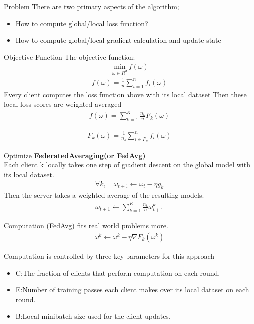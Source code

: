 \documentclass{beamer}
\begin{document}
\begin{frame}{Problem}
	There are two primary aspects of the algorithm;
	\begin{itemize}
		\item How to compute global/local loss function?
		\item How to compute global/local gradient calculation and update state
	\end{itemize}
\end{frame}

\begin{frame}{Objective Function}
	The objective function:
	\begin{align}
		\mathop{min}\limits_{\omega \in R^d}f(\omega)
	\end{align}
	\begin{align}
		f(\omega)=\frac{1}{n}\sum_{i=1}^{n}f_i(\omega)
	\end{align}
	Every client computes the loss function above with its local dataset
	Then these local loss scores are weighted-averaged
	\begin{align}
		f(\omega)=\sum_{k=1}^K\frac{n_k}{n}F_k(\omega)
	\end{align}

	\begin{align}
		F_k(\omega)=\frac{1}{n_k}\sum_{i \in P_k}^{n}f_i(\omega)
	\end{align}
\end{frame}

\begin{frame}{Optimize}
	\textbf{FederatedAveraging(or FedAvg)}\\
	Each client k locally takes one step of gradient descent on the global model with its local dataset.
	\begin{align}
		\forall k, \quad \omega_{t+1}\gets \omega_t-\eta g_k
	\end{align}
	Then the server takes a weighted average of the resulting models.
	\begin{align}
		\omega_{t+1}\gets \sum_{k=1}^{K} \frac{n_k}{n}\omega_{t+1}^k
	\end{align}
\end{frame}

\begin{frame}{Computation}
	(FedAvg) fits real world problems more.
	\begin{align}
		\omega^k \gets \omega^k-\eta \nabla F_k(\omega^k)
	\end{align}

	Computation is controlled by three key parameters for this approach
	\begin{itemize}
		\item C:The fraction of clients that perform computation  on each round.
		\item E:Number of training passes each client makes over its local dataset on each round.
		\item B:Local minibatch size used for the client updates.
	\end{itemize}
\end{frame}
\end{document}
